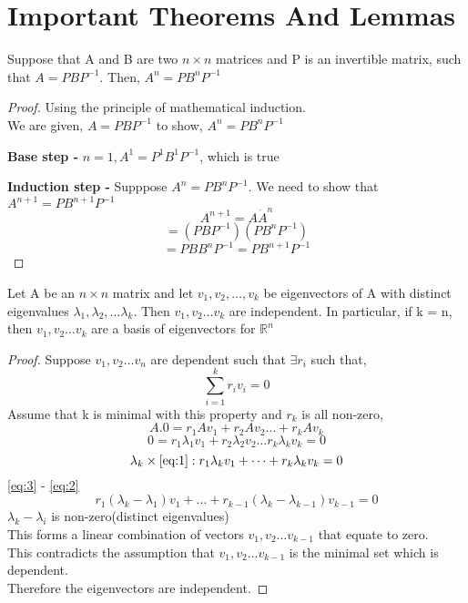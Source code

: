 \documentclass{report}
\begin{document}
\section{Important Theorems And Lemmas}
\begin{lemma}
   Suppose that A and B are two $n \times n$ matrices and P is an invertible matrix, such that $A = PBP^{-1}.$ Then, $A^{n} = PB^{n}P^{-1}$ 
\end{lemma}
\begin{proof}
	Using the principle of mathematical induction.\\
	We are given, $A = PBP^{-1}$
	to show, $A^{n} = PB^{n}P^{-1}$

	\textbf{Base step - } $n = 1, A^{1} = P^1 B^1 P^{-1}$, which is true 

	\textbf{Induction step - } Supppose $A^{n} = PB^{n}P^{-1}$. We need to show that $A^{n+1} = PB^{n+1}P^{-1}$
	\[
	   A^{n+1} = A \dot A^{n}
	\]
	\[
	   = (PBP^{-1})(PB^n P^{-1})
	\]
	\[
	= PBB^nP^{-1} = PB^{n+1}P^{-1} \]
\end{proof}
\begin{theorem}
   Let A be an $n \times n$ matrix and let $v_1,v_2,\dots,v_k$ be eigenvectors of A with distinct eigenvalues $\lambda_1, \lambda_2,\dots\lambda_k$. Then $v_1,v_2\dots v_k$ are independent. In particular, if k = n, then $v_1,v_2\dots v_k$ are a basis of eigenvectors for $\mathbb{R}^n$
\end{theorem}
\begin{proof}
	Suppose $v_1,v_2\dots v_n$ are dependent such that $\exists r_i$  such that,
	\begin{equation}
	    \sum_{i=1}^{k} r_i v_i = 0
		\label{eq:1}
	\end{equation}
	Assume that k is minimal with this property and $r_k$ is all non-zero,
	\[
		A.0 = r_1 A v_1 + r_2 A v_2 \dots + r_k A v_k
	\]
	\begin{equation}
	0 = r_1\lambda_1 v_1 + r_2 \lambda_2 v_2 \dots r_k \lambda_k v_k = 0	
		\label{eq:2}
	\end{equation}
	\begin{equation}
	   \lambda_k \times \ref{eq:1}: r_1 \lambda_k v_1 + \dots + r_k \lambda_k v_k = 0	
		\label{eq:3}
	\end{equation}
	\ref{eq:3} - \ref{eq:2}
	\[
	   r_1(\lambda_k - \lambda_1)v_1 + \dots + r_{k-1}(\lambda_k - \lambda_{k-1})v_{k-1} = 0
	\]
	$\lambda_k - \lambda_i$ is non-zero(distinct eigenvalues)\\
	This forms a linear combination of vectors $v_1,v_2\dots v_{k-1}$ that equate to zero. \\
	This contradicts the assumption that $v_1,v_2\dots v_{k-1}$ is the minimal set which is dependent. \\
	Therefore the eigenvectors are independent.
     \end{proof}
\end{document}
